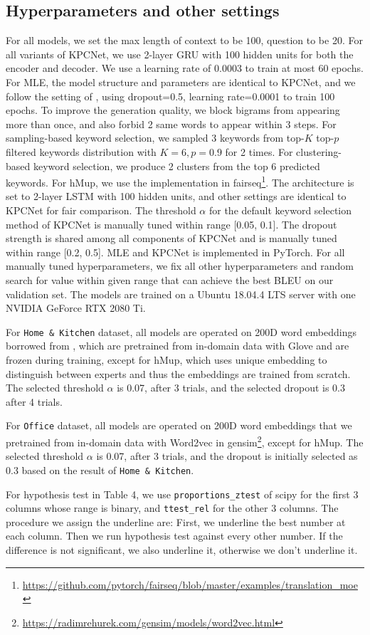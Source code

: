 \documentclass[letterpaper]{article} %
\begin{document}
\subsection{Hyperparameters and other settings}
For all models, we set the max length of context to be 100, question to be 20. For all variants of KPCNet, we use 2-layer GRU \citep{cho2014learning} with 100 hidden units for both the encoder and decoder. We use a learning rate of 0.0003 to train at most 60 epochs. For MLE, the model structure and parameters are identical to KPCNet, and we follow the setting of \citet{rao2019answer}, using dropout=0.5, learning rate=0.0001 to train 100 epochs. To improve the generation quality, we block bigrams from appearing more than once, and also forbid 2 same words to appear within 3 steps. For sampling-based keyword selection, we sampled 3 keywords from top-$K$ top-$p$ filtered keywords distribution with $K=6, p=0.9$ for 2 times. For clustering-based keyword selection, we produce 2 clusters from the top 6 predicted keywords. For hMup, we use the implementation in fairseq\footnote{\url{https://github.com/pytorch/fairseq/blob/master/examples/translation_moe}}. The architecture is set to 2-layer LSTM \citep{hochreiter1997long} with 100 hidden units, and other settings are identical to KPCNet for fair comparison. The threshold $\alpha$ for the default keyword selection method of KPCNet is manually tuned within range [0.05, 0.1]. The dropout strength is shared among all components of KPCNet and is manually tuned within range [0.2, 0.5]. MLE and KPCNet is implemented in PyTorch. For all manually tuned hyperparameters, we fix all other hyperparameters and random search for value within given range that can achieve the best BLEU on our validation set. The models are trained on a Ubuntu 18.04.4 LTS server with one NVIDIA GeForce RTX 2080 Ti. 

For \texttt{Home \& Kitchen} dataset, all models are operated on 200D word embeddings borrowed from \citet{rao2019answer}, which are pretrained from in-domain data with Glove \citep{pennington2014glove} and are frozen during training, except for hMup, which uses unique embedding to distinguish between experts and thus the embeddings are trained from scratch. The selected threshold $\alpha$ is 0.07, after 3 trials, and the selected dropout is 0.3 after 4 trials. 


For \texttt{Office} dataset, all models are operated on 200D word embeddings that we pretrained from in-domain data with Word2vec\citep{mikolov2013distributed} in gensim\footnote{\url{https://radimrehurek.com/gensim/models/word2vec.html}}, except for hMup. The selected threshold $\alpha$ is 0.07, after 3 trials, and the dropout is initially selected as 0.3 based on the result of \texttt{Home \& Kitchen}.

For hypothesis test in Table 4, we use \texttt{proportions\_ztest} of scipy for the first 3 columns whose range is binary, and \texttt{ttest\_rel} for the other 3 columns. The procedure we assign the underline are: First, we underline the best number at each column. Then we run hypothesis test against every other number. If the difference is not significant, we also underline it, otherwise we don't underline it. 


\end{document}

